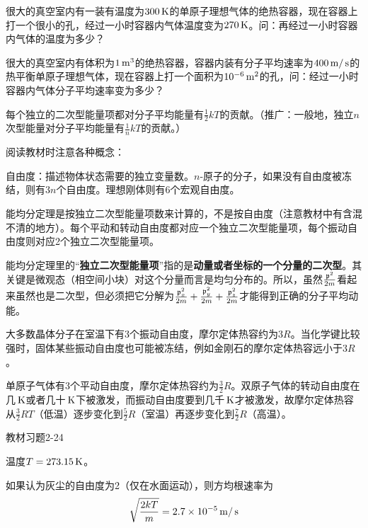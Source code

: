 \documentclass[CJK]{beamer}
\begin{document}
\begin{frame}
\bch
{}

很大的真空室内有一装有温度为$300\,\mathrm{K}$的单原子理想气体的绝热容器，现在容器上打一个很小的孔，经过一小时容器内气体温度变为$270\,\mathrm{K}$。问：再经过一小时容器内气体的温度为多少？
\ech
\end{frame}



\begin{frame}
\bch
{}

很大的真空室内有体积为$1\,\mathrm{m}^3$的绝热容器，容器内装有分子平均速率为$400\,\mathrm{m}/\,\mathrm{s}$的热平衡单原子理想气体，现在容器上打一个面积为$10^{-6}\,\mathrm{m}^2$的孔，问：经过一小时容器内气体分子平均速率变为多少？
\ech
\end{frame}


\begin{frame}
\bch
{\scriptsize
{\blue 每个独立的二次型能量项都对分子平均能量有$\frac{1}{2}kT$的贡献。（推广：一般地，独立$n$次型能量对分子平均能量有$\frac{1}{n}kT$的贡献。）}

阅读教材时注意各种概念：
\bitem
\item{自由度：描述物体状态需要的独立变量数。$n$-原子的分子，如果没有自由度被冻结，则有$3n$个自由度。理想刚体则有6个宏观自由度。}
\item{能均分定理是按独立二次型能量项数来计算的，不是按自由度（注意教材中有含混不清的地方）。每个平动和转动自由度都对应一个独立二次型能量项，每个振动自由度则对应2个独立二次型能量项。}
\item{能均分定理里的“{\bf 独立二次型能量项}”指的是{\bf 动量或者坐标的一个分量的二次型}。其关键是微观态（相空间小块）对这个分量而言是均匀分布的。所以，虽然$\frac{{\mathfrak{p}}^2}{2m}$看起来虽然也是二次型，但必须把它分解为$\frac{{\mathfrak{p}}_x^2}{2m}+\frac{{\mathfrak{p}}_y^2}{2m}+\frac{{\mathfrak{p}}_z^2}{2m}$才能得到正确的分子平均动能。}
\item{大多数晶体分子在室温下有3个振动自由度，摩尔定体热容约为$3R$。当化学键比较强时，固体某些振动自由度也可能被冻结，例如金刚石的摩尔定体热容远小于$3R$。}
\item{单原子气体有3个平动自由度，摩尔定体热容约为$\frac{3}{2}R$。双原子气体的转动自由度在几$\,\mathrm{K}$或者几十$\,\mathrm{K}$下被激发，而振动自由度要到几千$\,\mathrm{K}$才被激发，故摩尔定体热容从$\frac{3}{2}RT$（低温）逐步变化到$\frac{5}{2}R$（室温）再逐步变化到$\frac{7}{2}R$（高温）。}
\eitem
}
\ech
\end{frame}

\begin{frame}
\bch
{\blue 教材习题2-24}

\skipline

{\small
温度$T = 273.15\,\mathrm{K}$。

如果认为灰尘的自由度为2（仅在水面运动），则方均根速率为
$$\sqrt{\frac{2kT}{m}} = 2.7\times 10^{-5} \,\mathrm{m}/\,\mathrm{s}$$  
}

\ech
\end{frame}
\end{document}
